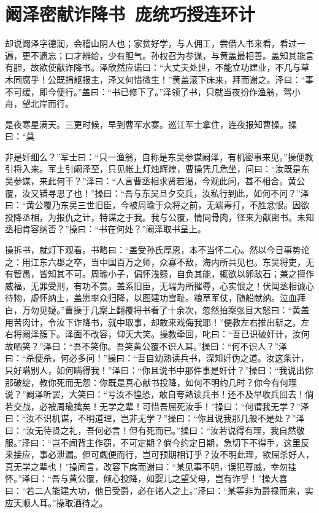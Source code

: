 \chapter{阚泽密献诈降书~庞统巧授连环计}

却说阚泽字德润，会稽山阴人也；家贫好学，与人佣工，尝借人书来看，看过一遍，更不遗忘；口才辨给，少有胆气。孙权召为参谋，与黄盖最相善。盖知其能言有胆，故欲使献诈降书。泽欣然应诺曰：“大丈夫处世，不能立功建业，不几与草木同腐乎！公既捐躯报主，泽又何惜微生！”黄盖滚下床来，拜而谢之。泽曰：“事不可缓，即今便行。”盖曰：“书已修下了。”泽领了书，只就当夜扮作渔翁，驾小舟，望北岸而行。

是夜寒星满天。三更时候，早到曹军水寨。巡江军士拿住，连夜报知曹操。操曰：“莫

非是奸细么？”军士曰：“只一渔翁，自称是东吴参谋阚泽，有机密事来见。”操便教引将入来。军士引阚泽至，只见帐上灯烛辉煌，曹操凭几危坐，问曰：“汝既是东吴参谋，来此何干？”泽曰：“人言曹丞相求贤若渴，今观此问，甚不相合。黄公覆，汝又错寻思了也！”操曰：“吾与东吴旦夕交兵，汝私行到此，如何不问？”泽曰：“黄公覆乃东吴三世旧臣，今被周瑜于众将之前，无端毒打，不胜忿恨。因欲投降丞相，为报仇之计，特谋之于我。我与公覆，情同骨肉，径来为献密书。未知丞相肯容纳否？”操曰：“书在何处？”阚泽取书呈上。

操拆书，就灯下观看。书略曰：“盖受孙氏厚恩，本不当怀二心。然以今日事势论之：用江东六郡之卒，当中国百万之师，众寡不敌，海内所共见也。东吴将吏，无有智愚，皆知其不可。周瑜小子，偏怀浅戆，自负其能，辄欲以卵敌石；兼之擅作威福，无罪受刑，有功不赏。盖系旧臣，无端为所摧辱，心实恨之！伏闻丞相诚心待物，虚怀纳士，盖愿率众归降，以图建功雪耻。粮草军仗，随船献纳。泣血拜白，万勿见疑。”曹操于几案上翻覆将书看了十余次，忽然拍案张目大怒曰：“黄盖用苦肉计，令汝下诈降书，就中取事，却敢来戏侮我耶！”便教左右推出斩之。左右将阚泽簇下。泽面不改容，仰天大笑。操教牵回，叱曰：“吾已识破奸计，汝何故哂笑？”泽曰：“吾不笑你。吾笑黄公覆不识人耳。”操曰：“何不识人？”泽曰：“杀便杀，何必多问！”操曰：“吾自幼熟读兵书，深知奸伪之道。汝这条计，只好瞒别人，如何瞒得我！”泽曰：“你且说书中那件事是奸计？”操曰：“我说出你那破绽，教你死而无怨：你既是真心献书投降，如何不明约几时？你今有何理说？”阚泽听罢，大笑曰：“亏汝不惶恐，敢自夸熟读兵书！还不及早收兵回去！倘若交战，必被周瑜擒矣！无学之辈！可惜吾屈死汝手！”操曰：“何谓我无学？”泽曰：“汝不识机谋，不明道理，岂非无学？”操曰：“你且说我那几般不是处？”泽曰：“汝无待贤之礼，吾何必言！但有死而已。”操曰：“汝若说得有理，我自然敬服。”泽曰：“岂不闻背主作窃，不可定期？倘今约定日期，急切下不得手，这里反来接应，事必泄漏。但可觑便而行，岂可预期相订乎？汝不明此理，欲屈杀好人，真无学之辈也！”操闻言，改容下席而谢曰：“某见事不明，误犯尊威，幸勿挂怀。”泽曰：“吾与黄公覆，倾心投降，如婴儿之望父母，岂有诈乎！”操大喜曰：“若二人能建大功，他日受爵，必在诸人之上。”泽曰：“某等非为爵禄而来，实应天顺人耳。”操取酒待之。

